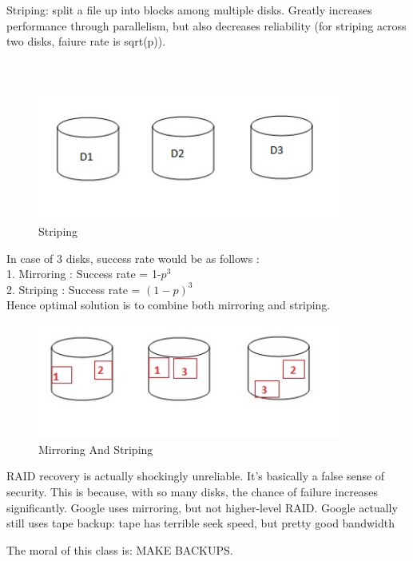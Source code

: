 \documentclass[twoside]{article}
\begin{document}
Striping: split a file up into blocks among multiple disks. Greatly increases performance through parallelism, but also decreases reliability (for striping across two disks, faiure rate is sqrt(p)).
\\
\\
\\

\begin{figure}[ht!]
\center
\includegraphics[width=100mm]{Striping.jpg}
\caption{ Striping \label{Striping diagram}}
\end{figure}

In case of 3 disks, success rate would be as follows : \\
1. Mirroring  : Success rate = 1-$p^3$ \\
2. Striping : Success rate = $(1-p)^3$ \\

Hence optimal solution is to combine both mirroring and striping.

\begin{figure}[ht!]
\center
\includegraphics[width=100mm]{MirroringAndStriping.jpg}
\caption{ Mirroring And Striping \label{MirroringAndStriping diagram}}
\end{figure}

RAID recovery is actually shockingly unreliable. It's basically a false sense of security. This is because, with so many disks, the chance of failure increases significantly. Google uses mirroring, but not higher-level RAID. Google actually still uses tape backup: tape has terrible seek speed, but pretty good bandwidth

The moral of this class is: MAKE BACKUPS.
\end{document}
